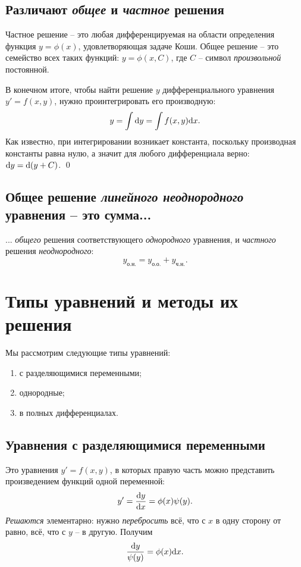 \documentclass[12pt]{report}
\begin{document}
\subsection{Различают \emph{общее} и \emph{частное} решения}
Частное решение -- это любая дифференцируемая на области определения функция $y = \phi(x)$, удовлетворяющая задаче Коши. Общее решение -- это семейство всех таких функций: $y = \phi(x, C)$, где $C$ -- символ \emph{произвольной} постоянной.
\begin{rmk}
	В конечном итоге, чтобы найти решение $y$ дифференциального уравнения $y' = f(x,y)$, нужно проинтегрировать его производную: 
	\[
		y = \int \mathrm d y = \int f(x,y)\mathrm d x.
	\]
	Как известно, при интегрировании возникает константа, поскольку производная константы равна нулю, а значит для любого дифференциала верно: $\mathrm d y = \mathrm d(y + C)$. \qed
\end{rmk}
\subsection{Общее решение \emph{линейного неоднородного} уравнения -- это сумма...} 
... \emph{общего} решения соответствующего \emph{однородного} уравнения, и \emph{частного} решения \emph{неоднородного}:
\begin{equation}\label{eq:general-inhomogenous-soln}
	y_{\text{о.н.}} = y_{\text{о.о.}} + y_{\text{ч.н.}}.
\end{equation}

\section{Типы уравнений и методы их решения~\cite{Kyasov}}
Мы рассмотрим следующие типы уравнений:
\begin{enumerate}
	\item с разделяющимися переменными;
	\item однородные;
	\item в полных дифференциалах.
\end{enumerate}

\subsection{Уравнения с разделяющимися переменными}
Это уравнения $y' = f(x,y)$, в которых правую часть можно представить произведением функций одной переменной:
\begin{equation*}
	y' = \frac{\mathrm d y}{\mathrm d x} = \phi(x)\psi(y).
\end{equation*}
\emph{Решаются} элементарно: нужно \emph{перебросить} всё, что с $x$ в одну сторону от равно, всё, что с $y$ -- в другую. Получим
\[
	\frac{\mathrm d y}{\psi(y)} = \phi(x)\mathrm d x.
\]
\end{document}
